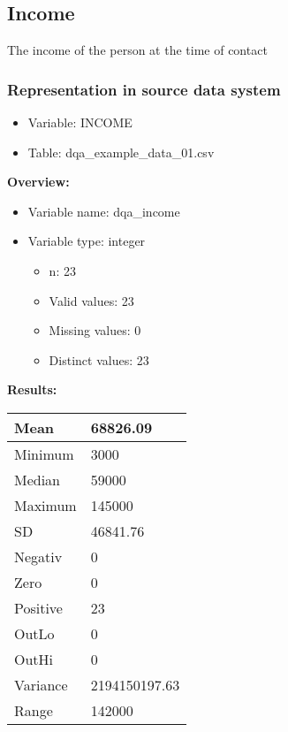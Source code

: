 \documentclass[
]{article}
\providecommand{\tightlist}{%
  \setlength{\itemsep}{0pt}\setlength{\parskip}{0pt}}
\begin{document}
\hypertarget{income}{%
\subsection{Income}\label{income}}

The income of the person at the time of contact

\hypertarget{representation-in-source-data-system-7}{%
\subsubsection{\texorpdfstring{Representation in \textbf{source} data
system}{Representation in source data system}}\label{representation-in-source-data-system-7}}

\begin{itemize}
\tightlist
\item
  Variable: INCOME
\item
  Table: dqa\_example\_data\_01.csv
\end{itemize}

\textbf{Overview:}

\begin{itemize}
\tightlist
\item
  Variable name: dqa\_income
\item
  Variable type: integer

  \begin{itemize}
  \tightlist
  \item
    n: 23
  \item
    Valid values: 23
  \item
    Missing values: 0
  \item
    Distinct values: 23
  \end{itemize}
\end{itemize}

\textbf{Results:}\\

\begin{table}[H]
\centering
\begin{tabular}{l|l}
\hline
Mean & 68826.09\\
\hline
Minimum & 3000\\
\hline
Median & 59000\\
\hline
Maximum & 145000\\
\hline
SD & 46841.76\\
\hline
Negativ & 0\\
\hline
Zero & 0\\
\hline
Positive & 23\\
\hline
OutLo & 0\\
\hline
OutHi & 0\\
\hline
Variance & 2194150197.63\\
\hline
Range & 142000\\
\hline
\end{tabular}
\end{table}
\end{document}

